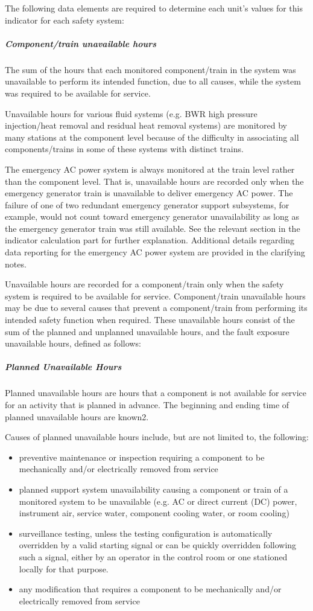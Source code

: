 The following data elements are required to determine each unit's
values for this indicator for each safety system:

\subparagraph{Component/train unavailable hours}

The sum of the hours that each monitored component/train in the system
was unavailable to perform its intended function, due to all causes,
while the system was required to be available for service.

Unavailable hours for various fluid systems (e.g. BWR high pressure
injection/heat removal and residual heat removal systems) are
monitored by many stations at the component level because of the
difficulty in associating all components/trains in some of these
systems with distinct trains.

The emergency AC power system is always monitored at the train level
rather than the component level. That is, unavailable hours are
recorded only when the emergency generator train is unavailable to
deliver emergency AC power. The failure of one of two redundant
emergency generator support subsystems, for example, would not count
toward emergency generator unavailability as long as the emergency
generator train was still available. See the relevant section in the
indicator calculation part for further explanation. Additional details
regarding data reporting for the emergency AC power system are
provided in the clarifying notes.

Unavailable hours are recorded for a component/train only when the
safety system is required to be available for service. Component/train
unavailable hours may be due to several causes that prevent a
component/train from performing its intended safety function when
required. These unavailable hours consist of the sum of the planned
and unplanned unavailable hours, and the fault exposure unavailable
hours, defined as follows:

\subparagraph{Planned Unavailable Hours}

Planned unavailable hours are hours that a component is not available
for service for an activity that is planned in advance. The beginning
and ending time of planned unavailable hours are known2.

Causes of planned unavailable hours include, but are not limited to,
the following:
\begin{itemize}
\item preventive maintenance or inspection requiring a component to be mechanically and/or electrically removed from service
\item planned support system unavailability causing a component or train of a monitored system to be unavailable (e.g. AC or direct current (DC) power, instrument air, service water, component cooling water, or room cooling)
\item surveillance testing, unless the testing configuration is automatically overridden by a valid starting signal or can be quickly overridden following such a signal, either by an operator in the control room or one stationed locally for that purpose.
\item any modification that requires a component to be mechanically
  and/or electrically removed from service
\end{itemize}

